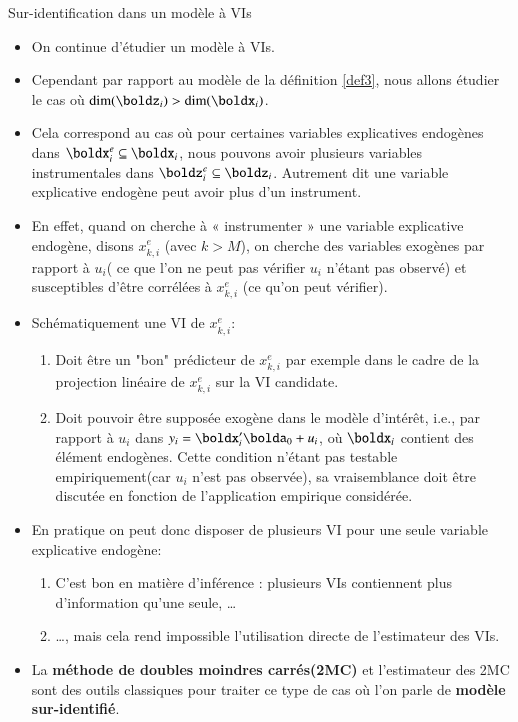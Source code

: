 \begin{frame}[allowframebreaks]{Sur-identification dans un modèle à VIs}
\begin{itemize}
\item On continue d'étudier un modèle à VIs.
\item Cependant par rapport au modèle de la définition \ref{def3}, nous allons 
étudier le cas où $\dim(\boldz_i) > \dim(\boldx_i)$. 
\item Cela correspond au cas où pour certaines variables explicatives endogènes dans $\boldx^e_i\subseteq\boldx_i$, 
nous pouvons avoir plusieurs variables instrumentales dans $\boldz_i^e\subseteq \boldz_i$. Autrement 
dit une variable explicative endogène peut avoir plus d'un instrument. 
\item En effet, quand on cherche à « instrumenter » une variable explicative
endogène, disons $x^e_{k,i}$ (avec $k>M$), on cherche des variables exogènes par rapport à $u_i$(
ce que l'on ne peut pas vérifier $u_i$ n'étant pas observé) 
et susceptibles d’être corrélées à $x^e_{k, i}$ (ce qu’on peut vérifier). 
\item Schématiquement une VI 
de $x^e_{k, i}$:
\begin{enumerate}
\item Doit être un "bon" prédicteur de $x^e_{k, i}$ par exemple 
dans le cadre de la projection linéaire de $x^e_{k, i}$ sur la VI candidate.
\item Doit pouvoir être supposée exogène dans le modèle d'intérêt, i.e., par rapport à $u_i$ dans 
$y_i = \boldx_i^\prime\bolda_0 + u_i$, où $ \boldx_i$ contient des élément endogènes. 
Cette condition n'étant pas testable empiriquement(car $u_i$ n'est pas observée), sa vraisemblance 
doit être discutée en fonction de l'application empirique considérée.
\end{enumerate}

\framebreak 

\item En pratique on peut donc disposer de plusieurs VI pour une seule variable explicative endogène: 
\begin{enumerate}[$\star$]
\item C’est bon en matière d’inférence : plusieurs VIs contiennent plus d’information qu’une seule, \ldots
\item \ldots, mais cela rend impossible l’utilisation directe de l’estimateur des VIs.
\end{enumerate}
\item La \textbf{méthode de doubles moindres carrés(2MC)} et l'estimateur des 2MC 
sont des outils classiques pour traiter ce type de cas où l'on parle de \textbf{modèle sur-identifié}.
\end{itemize}


\end{frame}
